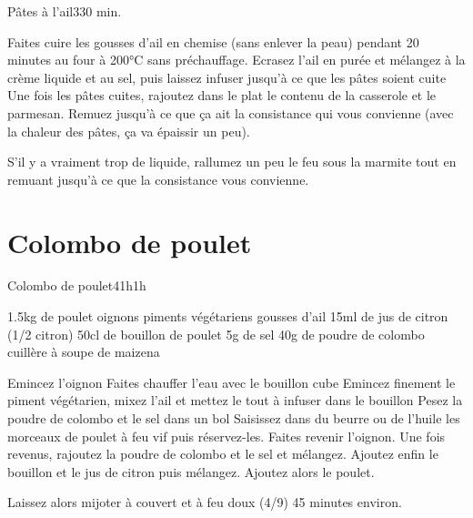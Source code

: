 {\begin{recette}{Pâtes à l'ail}{3}{30 min.}{}
\begin{preparation}
\etape Faites cuire les gousses d'ail en chemise (sans enlever la peau) pendant 20 minutes au four à 200°C sans préchauffage. 
\etape Ecrasez l'ail en purée et mélangez à la crème liquide et au sel, puis laissez infuser jusqu'à ce que les pâtes soient cuite
\etape Une fois les pâtes cuites, rajoutez dans le plat le contenu de la casserole et le parmesan. Remuez jusqu'à ce que ça ait la consistance qui vous convienne (avec la chaleur des pâtes, ça va épaissir un peu).
\begin{remarque}
S'il y a vraiment trop de liquide, rallumez un peu le feu sous la marmite tout en remuant jusqu'à ce que la consistance vous convienne.
\end{remarque}
\end{preparation}
\end{recette}

\section{Colombo de poulet}
\begin{recette}{Colombo de poulet}{4}{1h}{1h}
\begin{ingredients}
\ingredient 1.5kg de poulet
 oignons
 piments végétariens
 gousses d'ail
\ingredient 15ml de jus de citron (1/2 citron)
\ingredient 50cl de bouillon de poulet
\ingredient 5g de sel
\ingredient 40g de poudre de colombo
 cuillère à soupe de maizena
\end{ingredients}


\begin{preparation}
\etape Emincez l'oignon
\etape Faites chauffer l'eau avec le bouillon cube
\etape Emincez finement le piment végétarien, mixez l'ail et mettez le tout à infuser dans le bouillon
\etape Pesez la poudre de colombo et le sel dans un bol
\etape Saisissez dans du beurre ou de l'huile les morceaux de poulet à feu vif puis réservez-les.
\etape Faites revenir l'oignon.
\etape Une fois revenus, rajoutez la poudre de colombo et le sel et mélangez. 
\etape Ajoutez enfin le bouillon et le jus de citron puis mélangez. Ajoutez alors le poulet.
\end{preparation}

\begin{cuisson}
Laissez alors mijoter à couvert et à feu doux (4/9) 45 minutes environ.
\end{cuisson}
\end{recette}

}%
